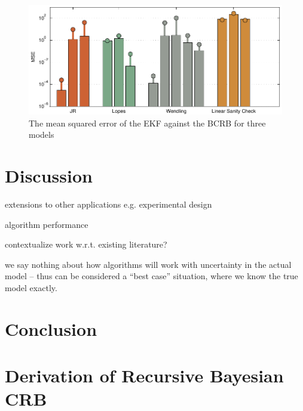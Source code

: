 \documentclass{article}
\begin{document}
\begin{figure}[ht]
  \begin{center}
    \includegraphics{./figures/pdf/CRBbar}
  \end{center}
  \caption{The mean squared error of the EKF against the BCRB for three models}
  \label{fig:CrbBar}
\end{figure}


\section{Discussion}

extensions to other applications e.g. experimental design

algorithm performance

contextualize work w.r.t. existing literature?

we say nothing about how algorithms will work with uncertainty in the actual model -- thus can be considered a ``best case'' situation, where we know the true model exactly.

\section{Conclusion}

\appendix
\section{Derivation of Recursive Bayesian CRB}\label{sec:derivation_recursion}
\end{document}
